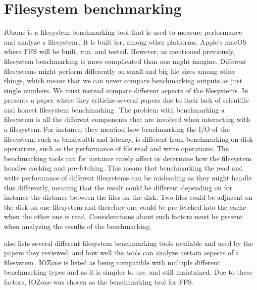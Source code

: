 \section{Filesystem benchmarking}
\label{sec:iozone}
IOzone is a filesystem benchmarking tool that is used to measure performance and analyze a filesystem\,\cite{IozoneFilesystemBenchmark}. It is built for, among other platforms, Apple's macOS where \gls{FFS} will be built, run, and tested. However, as mentioned previously, filesystem benchmarking is more complicated than one might imagine. Different filesystems might perform differently on small and big file sizes among other things, which means that we can never compare benchmarking outputs as just single numbers. We must instead compare different aspects of the filesystems. In \citeyear{tarasovBenchmarkingFileSystem2011} \citeauthor{tarasovBenchmarkingFileSystem2011} presents a paper where they criticize several papers due to their lack of scientific and honest filesystem benchmarking\,\cite{tarasovBenchmarkingFileSystem2011}. The problem with benchmarking a filesystem is all the different components that are involved when interacting with a filesystem. For instance, they mention how benchmarking the \gls{I/O} of the filesystem, such as bandwidth and latency, is different from benchmarking on-disk operations, such as the performance of file read and write operations. The benchmarking tools can for instance rarely affect or determine how the filesystem handles caching and pre-fetching. This means that benchmarking the read and write performance of different filesystems can be misleading as they might handle this differently, meaning that the result could be different depending on for instance the distance between the files on the disk. Two files could be adjacent on the disk on one filesystem and therefore one could be pre-fetched into the cache when the other one is read. Considerations about such factors must be present when analyzing the results of the benchmarking.

\citeauthor{tarasovBenchmarkingFileSystem2011} also lists several different filesystem benchmarking tools available and used by the papers they reviewed, and how well the tools can analyze certain aspects of a filesystem\,\cite{tarasovBenchmarkingFileSystem2011}. IOZone is listed as being compatible with multiple different benchmarking types and as it is simpler to use\,\cite{agarwalComparingIOBenchmarks2018} and still maintained. Due to these factors, IOZone was chosen as the benchmarking tool for \gls{FFS}.